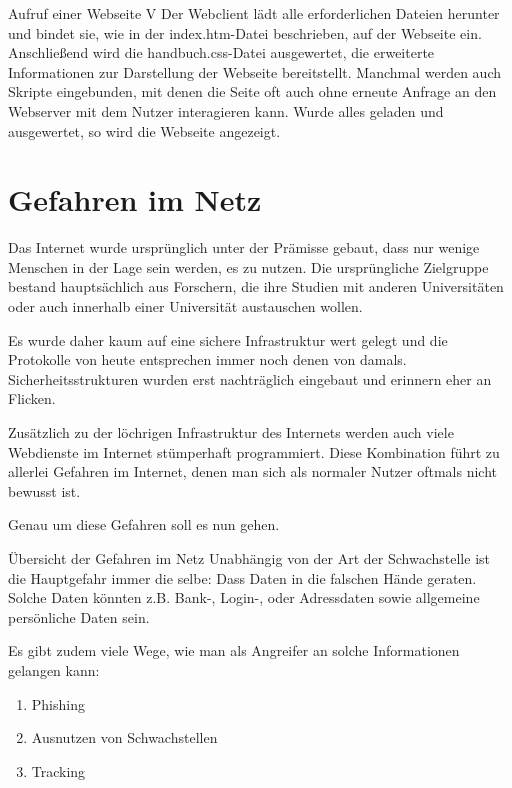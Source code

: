 \documentclass[utf8]{beamer}
\begin{document}
	\begin{frame}{Aufruf einer Webseite V}
		Der Webclient lädt alle erforderlichen Dateien herunter und bindet sie, wie in der     index.htm-Datei beschrieben, auf der Webseite ein. Anschließend wird die handbuch.css-Datei ausgewertet, die erweiterte Informationen zur Darstellung der Webseite bereitstellt. Manchmal werden auch Skripte eingebunden, mit denen die Seite oft auch ohne erneute Anfrage an den Webserver mit dem Nutzer interagieren kann. Wurde alles geladen und ausgewertet, so wird die Webseite angezeigt.
	\end{frame}
	
	\section{Gefahren im Netz}
	\begin{frame}
		Das Internet wurde ursprünglich unter der Prämisse gebaut, dass nur wenige Menschen in der Lage sein werden, es zu nutzen. Die ursprüngliche Zielgruppe bestand hauptsächlich aus Forschern, die ihre Studien mit anderen Universitäten oder auch innerhalb einer Universität austauschen wollen.
		
		Es wurde daher kaum auf eine sichere Infrastruktur wert gelegt und die Protokolle von heute entsprechen immer noch denen von damals. Sicherheitsstrukturen wurden erst nachträglich eingebaut und erinnern eher an Flicken.
	\end{frame}

	\begin{frame}
		Zusätzlich zu der löchrigen Infrastruktur des Internets werden auch viele Webdienste im Internet stümperhaft programmiert. Diese Kombination führt zu allerlei Gefahren im Internet, denen man sich als normaler Nutzer oftmals nicht bewusst ist.
		
		Genau um diese Gefahren soll es nun gehen.
	\end{frame}

	\begin{frame}{Übersicht der Gefahren im Netz}
		Unabhängig von der Art der Schwachstelle ist die Hauptgefahr immer die selbe: Dass Daten in die falschen Hände geraten. Solche Daten könnten z.B. Bank-, Login-, oder Adressdaten sowie allgemeine persönliche Daten sein. 
		
		Es gibt zudem viele Wege, wie man als Angreifer an solche Informationen gelangen kann:
		\begin{enumerate}
			\item Phishing
			\item Ausnutzen von Schwachstellen
			\item Tracking			
		\end{enumerate}
	\end{frame}
\end{document}
